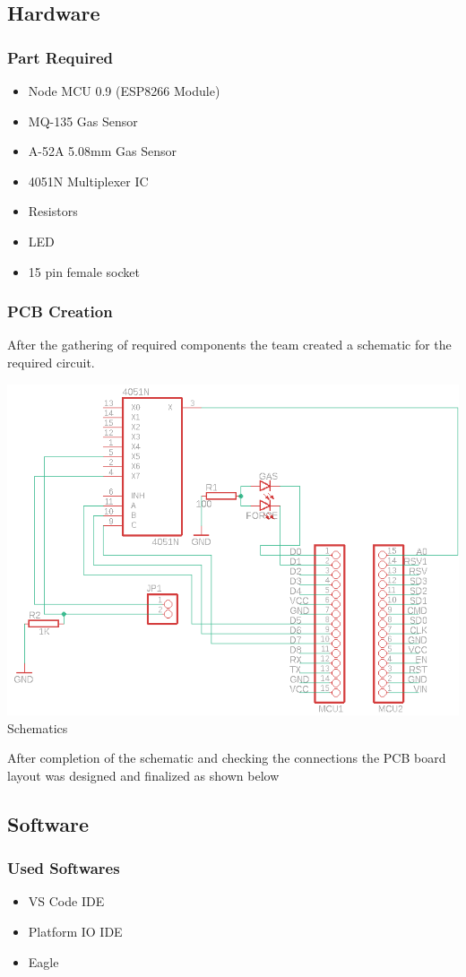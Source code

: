 \documentclass[conference]{IEEEtran}
\newenvironment{Figure}
  {\par\medskip\noindent\minipage{\linewidth}}
  {\endminipage\par\medskip}
\begin{document}
\subsection{Hardware}
\subsubsection{Part Required}
\begin{itemize}
    \item Node MCU 0.9 (ESP8266 Module)
    \item MQ-135 Gas Sensor
    \item A-52A 5.08mm Gas Sensor
    \item 4051N Multiplexer IC
    \item Resistors
    \item LED
    \item 15 pin female socket
\end{itemize}
\subsubsection{PCB Creation}
After the gathering of required components the team created a
schematic for the required circuit.
\begin{Figure}
    \centering
    \includegraphics[width=\linewidth]{Images/Schematic.png}
    \label{schem}
    \figurename{Schematics}
\end{Figure}
After completion of the schematic and checking the connections the PCB board
layout was designed and finalized as shown below

\subsection{Software}
\subsubsection{Used Softwares}
\begin{itemize}
    \item VS Code IDE
    \item Platform IO IDE
    \item Eagle
\end{itemize}



\end{document}
